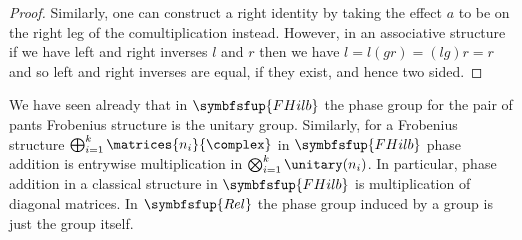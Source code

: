 \documentclass[fleqn]{NotesClass}
\makeatletter
\newcommand{\c@egory}[1]{\symbfsfup{#1}}
\newcommand{\Rel}{\c@egory{Rel}}
\newcommand{\FHilb}{\c@egory{FHilb}}
\makeatother
\begin{document}
\begin{thm}{}{}
\begin{proof}
            Similarly, one can construct a right identity by taking the effect \(a\) to be on the right leg of the comultiplication instead.
            However, in an associative structure if we have left and right inverses \(l\) and \(r\) then we have \(l = l(gr) = (lg)r = r\) and so left and right inverses are equal, if they exist, and hence two sided.
        \end{proof}
    \end{thm}
    
    We have seen already that in \(\FHilb\) the phase group for the pair of pants Frobenius structure is the unitary group.
    Similarly, for a Frobenius structure \(\bigoplus_{i=1}^k \matrices{n_i}{\complex}\) in \(\FHilb\) phase addition is entrywise multiplication in \(\bigotimes_{i=1}^k \unitary(n_i)\).
    In particular, phase addition in a classical structure in \(\FHilb\) is multiplication of diagonal matrices.
    In \(\Rel\) the phase group induced by a group is just the group itself.
    
\end{document}
